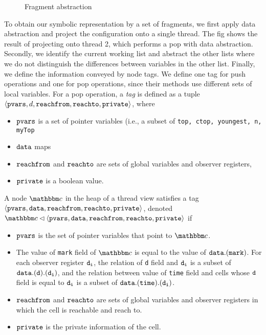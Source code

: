 
\begin{figure}
	
\caption{Fragment abstraction}
\label{fig:tsviewshape}
\end{figure} 
To obtain our symbolic representation by a set of fragments, we first apply data abstraction and
project the configuration onto a single thread. The fig shows the result
of projecting onto thread 2, which performs a pop with data abstraction. Secondly, we identify the current working list and abstract the other lists where we do not distinguish the differences between variables in the other list. Finally, we define the information conveyed by node tags. We define one tag for push operations and one for pop operations, since
their methods use different sets of local variables.
For a pop operation, a {\em tag} is defined as a tuple
$\left\langle\mathtt{pvars},d,\mathtt{reachfrom},\mathtt{reachto},\mathtt{private}\right\rangle$, where
\begin{itemize}
\item
  $\mathtt{pvars}$ is a set of pointer variables (i.e., a subset of
  {\tt top, ctop, youngest, n, myTop}
\item
  $\mathtt{data}$ maps
\item
  $\mathtt{reachfrom}$ and $\mathtt{reachto}$ are sets of global variables and observer registers, %
\item
  $\mathtt{private}$ is a boolean value.
\end{itemize}
A node $\cell$ in the heap of a thread view satisfies a tag $\left\langle\mathtt{pvars},\mathtt{data},\mathtt{reachfrom},\mathtt{reachto},\mathtt{private}\right\rangle$,
denoted $\cell \lhd \tagtuple$ if
\begin{itemize}
\item
  $\mathtt{pvars}$ is the set of pointer variables that point to $\cell$.
\item
The value of {\tt mark} field of $\cell$ is equal to the value of $\mathtt{data}\tt {.(mark)}$. For each observer register $\tt d_i$, the relation of {\tt d} field  and $\tt d_i$ is a subset of $\mathtt{data}\tt {.(d).(d_i)}$, and the relation between value of {\tt time} field and cells whose $\tt d$ field is equal to $\tt d_i$ is a subset of $\mathtt{data}\tt {.(time).(d_i)}$. 
\item $\mathtt{reachfrom}$ and $\mathtt{reachto}$ are sets of global variables and observer registers in which the cell is reachable and reach to.
\item $\mathtt{private}$ is the private information of the cell.
\end{itemize}

